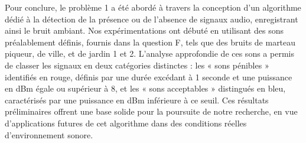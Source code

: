 Pour conclure, le problème 1 a été abordé à travers la conception d’un algorithme dédié à la détection de la présence ou de l’absence de signaux audio, enregistrant ainsi le bruit ambiant. Nos expérimentations ont débuté en utilisant des sons préalablement définis, fournis dans la question F, tels que des bruits de marteau piqueur, de ville, et de jardin 1 et 2. L’analyse approfondie de ces sons a permis de classer les signaux en deux catégories distinctes : les «  sons pénibles » identifiés en rouge, définis par une durée excédant à 1 seconde et une puissance en dBm égale ou supérieur à 8, et les « sons acceptables » distingués en bleu, caractérisés par une puissance en dBm inférieure à ce seuil. Ces résultats préliminaires offrent une base solide pour la poursuite de notre recherche, en vue d’applications futures de cet algorithme dans des conditions réelles d’environnement sonore.